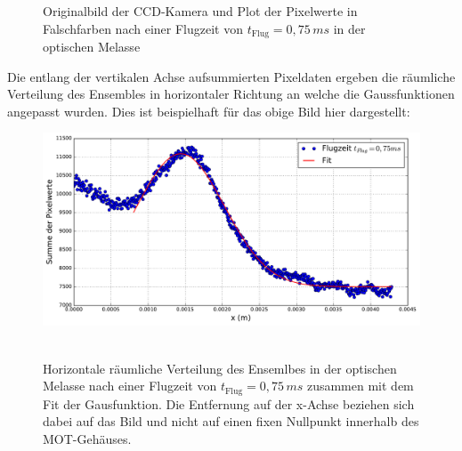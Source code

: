 \documentclass[twoside,colorback,accentcolor=tud4c,11pt]{tudreport}
\begin{document}
\begin{figure}[H]
  \centering
  \quad
  \quad
  \caption{Originalbild der CCD-Kamera und Plot der Pixelwerte in Falschfarben nach einer Flugzeit von $t_{\text{Flug}}=0,75\,\si{ms}$ in der optischen Melasse}
  \label{falori}
\end{figure}
Die entlang der vertikalen Achse aufsummierten Pixeldaten ergeben die räumliche Verteilung des Ensembles in horizontaler Richtung an welche die Gaussfunktionen angepasst wurden. Dies ist beispielhaft für das obige Bild hier dargestellt:
\begin{figure}[H]
\centering
   	\begin{minipage}[b]{0.85\textwidth}
   	\includegraphics[width=\textwidth]{graphics/0_75ms.pdf}\
   	\end{minipage}
\caption{Horizontale räumliche Verteilung des Ensemlbes in der optischen Melasse nach einer Flugzeit von $t_{\text{Flug}}=0,75\,\si{ms}$ zusammen mit dem Fit der Gausfunktion. Die Entfernung auf der x-Achse beziehen sich dabei auf das Bild und nicht auf einen fixen Nullpunkt innerhalb des MOT-Gehäuses.}\label{075fit}	
\end{figure}
\newpage
\end{document}
